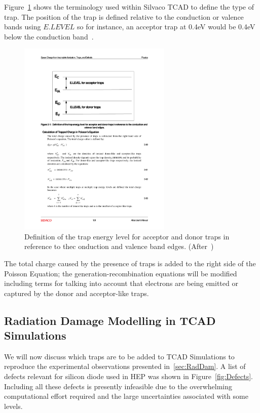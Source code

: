 Figure~\ref{fig:TCAD_Defects} shows the terminology used within Silvaco TCAD to define the type of trap. The position of the trap is defined relative to the conduction or valence bands using $E.LEVEL$ so for instance, an acceptor trap at 0.4eV would be 0.4eV below the conduction band~\cite{SilvacoAtlas}.

\begin{figure}
\centering
\includegraphics[width=0.65\textwidth]{TCAD_traps.pdf}
\caption{\label{fig:TCAD_Defects}Definition of the trap energy level for acceptor and donor traps in reference to thec onduction and valence band edges. (After~\cite{SilvacoAtlas})}
\end{figure}

The total charge caused by the presence of traps is added to the right side of the Poisson Equation; 
the generation-recombination equations will be modified including terms for talking into account 
that electrons are being emitted or captured by the donor and acceptor-like traps.



\subsection{Radiation Damage Modelling in TCAD Simulations}

We will now discuss which traps are to be added to TCAD Simulations to reproduce the 
experimental observations presented in~\ref{sec:RadDam}.
A list of defects relevant for silicon diode used in HEP was shown 
in Figure~\ref{fig:Defects}.  Including all these defects is presently infeasible  due to the overwhelming computational effort required and the large uncertainties associated with some levels. 


